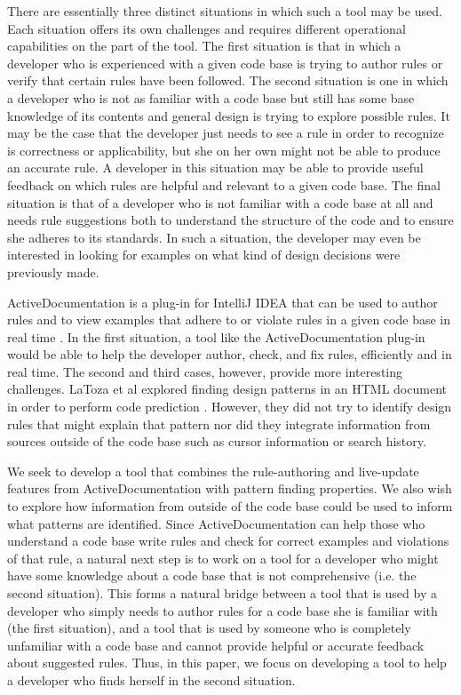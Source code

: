 \documentclass[12pt]{article}
\begin{document}
There are essentially three distinct situations in which such a tool may be used. Each situation offers its own challenges and requires different operational capabilities on the part of the tool. The first situation is that in which a developer who is experienced with a given code base is trying to author rules or verify that certain rules have been followed. The second situation is one in which a developer who is not as familiar with a code base but still has some base knowledge of its contents and general design is trying to explore possible rules. It may be the case that the developer just needs to see a rule in order to recognize is correctness or applicability, but she on her own might not be able to produce an accurate rule. A developer in this situation may be able to provide useful feedback on which rules are helpful and relevant to a given code base. The final situation is that of a developer who is not familiar with a code base at all and needs rule suggestions both to understand the structure of the code and to ensure she adheres to its standards. In such a situation, the developer may even be interested in looking for examples on what kind of design decisions were previously made.

ActiveDocumentation is a plug-in for IntelliJ IDEA that can be used to author rules and to view examples that adhere to or violate rules in a given code base in real time \cite{MehrpurEtAl2019}. In the first situation, a tool like the ActiveDocumentation plug-in would be able to help the developer author, check, and fix rules, efficiently and in real time. The second and third cases, however, provide more interesting challenges. LaToza et al explored finding design patterns in an HTML document in order to perform code prediction \cite{LaTozaEtAl2019}. However, they did not try to identify design rules that might explain that pattern nor did they integrate information from sources outside of the code base such as cursor information or search history.

We seek to develop a tool that combines the rule-authoring and live-update features from ActiveDocumentation with pattern finding properties. We also wish to explore how information from outside of the code base could be used to inform what patterns are identified. Since ActiveDocumentation can help those who understand a code base write rules and check for correct examples and violations of that rule, a natural next step is to work on a tool for a developer who might have some knowledge about a code base that is not comprehensive (i.e. the second situation). This forms a natural bridge between a tool that is used by a developer who simply needs to author rules for a code base she is familiar with (the first situation), and a tool that is used by someone who is completely unfamiliar with a code base and cannot provide helpful or accurate feedback about suggested rules. Thus, in this paper, we focus on developing a tool to help a developer who finds herself in the second situation.
\end{document}
